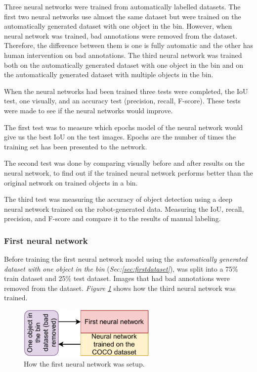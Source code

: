 Three neural networks were trained from automatically labelled datasets. 
The first two neural networks use almost the same dataset but were trained on the automatically generated dataset with one object in the bin. 
However, when neural network was trained, bad annotations were removed from the dataset. 
Therefore, the difference between them is one is fully automatic and the other has human intervention on bad annotations.
The third neural network was trained both on the automatically generated dataset with one object in the bin and on the automatically generated dataset with multiple objects in the bin.

When the neural networks had been trained three tests were completed, the IoU test, one visually, and an accuracy test (precision, recall, F-score). These tests were made to see if the neural networks would improve. 

The first test was to measure which epochs model of the neural network would give us the best IoU on the test images. Epochs are the number of times the training set has been presented to the network.

The second test was done by comparing visually before and after results on the neural network, to find out if the trained neural network performs better than the original network on trained objects in a bin. 

The third test was measuring the accuracy of object detection using a deep neural network trained on the robot-generated data. Measuring the IoU, recall, precision, and F-score and compare it to the results of manual labeling. 


\subsubsection{First neural network}
Before training the first neural network model using the \textit{automatically generated dataset with one object in the bin} (\textit{Sec:\ref{sec:firstdataset}}), was split into a 75\% train dataset and 25\% test dataset. Images that had bad annotations were removed from the dataset. \textit{Figure \ref{fig:firstneural}} shows how the third neural network was trained.

\begin{figure}[h]
 \centering
 \includegraphics[width=0.6\textwidth]{graphics/results/firstneural.pdf}
 \caption{How the first neural network was setup.}
 \label{fig:firstneural}
\end{figure}

